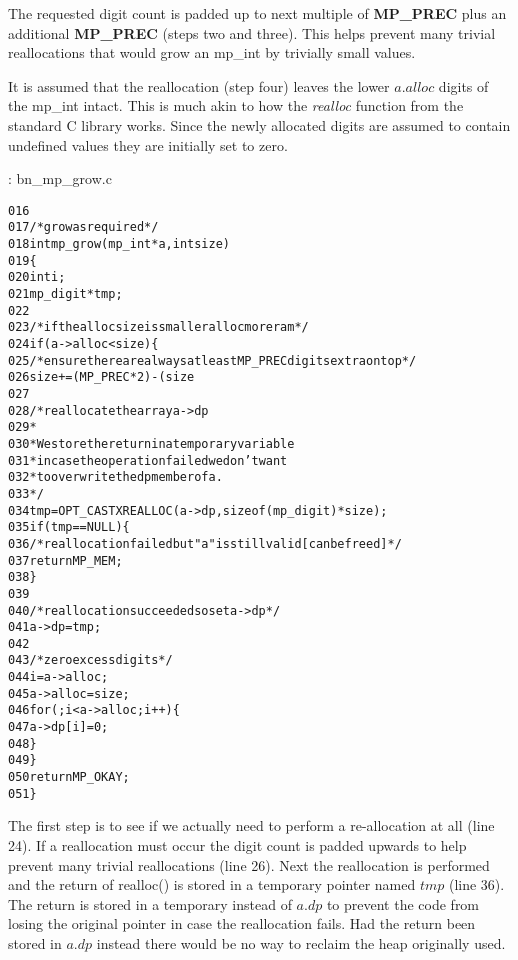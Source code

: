 \documentclass[b5paper]{book}
\begin{document}
The requested digit count is padded up to next multiple of \textbf{MP\_PREC} plus an additional \textbf{MP\_PREC} (steps two and three).  
This helps prevent many trivial reallocations that would grow an mp\_int by trivially small values.  

It is assumed that the reallocation (step four) leaves the lower $a.alloc$ digits of the mp\_int intact.  This is much 
akin to how the \textit{realloc} function from the standard C library works.  Since the newly allocated digits are 
assumed to contain undefined values they are initially set to zero.

\vspace{+3mm}\begin{small}
\hspace{-5.1mm}{\bf File}: bn\_mp\_grow.c
\vspace{-3mm}
\begin{alltt}
016   
017   /* grow as required */
018   int mp_grow (mp_int * a, int size)
019   \{
020     int     i;
021     mp_digit *tmp;
022   
023     /* if the alloc size is smaller alloc more ram */
024     if (a->alloc < size) \{
025       /* ensure there are always at least MP_PREC digits extra on top */
026       size += (MP_PREC * 2) - (size % MP_PREC);
027   
028       /* reallocate the array a->dp
029        *
030        * We store the return in a temporary variable
031        * in case the operation failed we don't want
032        * to overwrite the dp member of a.
033        */
034       tmp = OPT_CAST XREALLOC (a->dp, sizeof (mp_digit) * size);
035       if (tmp == NULL) \{
036         /* reallocation failed but "a" is still valid [can be freed] */
037         return MP_MEM;
038       \}
039   
040       /* reallocation succeeded so set a->dp */
041       a->dp = tmp;
042   
043       /* zero excess digits */
044       i        = a->alloc;
045       a->alloc = size;
046       for (; i < a->alloc; i++) \{
047         a->dp[i] = 0;
048       \}
049     \}
050     return MP_OKAY;
051   \}
\end{alltt}
\end{small}

The first step is to see if we actually need to perform a re-allocation at all (line 24).  If a reallocation
must occur the digit count is padded upwards to help prevent many trivial reallocations (line 26).  Next the reallocation is performed
and the return of realloc() is stored in a temporary pointer named $tmp$ (line 36).  The return is stored in a temporary
instead of $a.dp$ to prevent the code from losing the original pointer in case the reallocation fails.  Had the return been stored 
in $a.dp$ instead there would be no way to reclaim the heap originally used.
\end{document}
